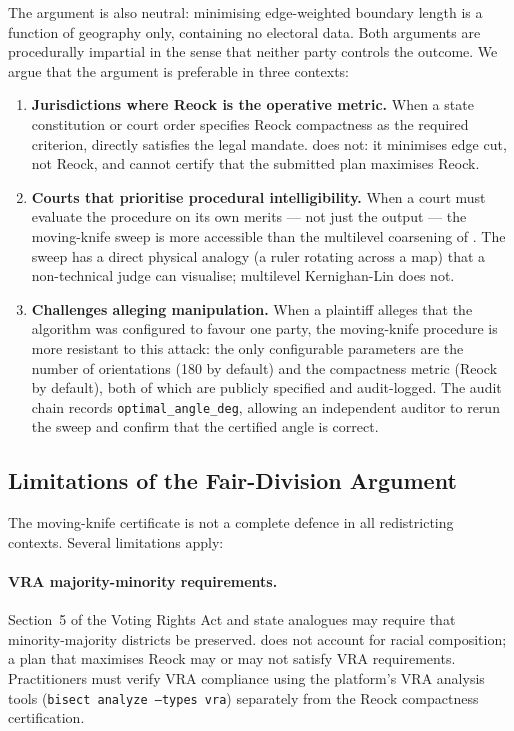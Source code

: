 The \metis{} argument is also neutral: minimising edge-weighted boundary
length is a function of geography only, containing no electoral data.
Both arguments are procedurally impartial in the sense that neither
party controls the outcome.
We argue that the \mka{} argument is preferable in three contexts:

\begin{enumerate}
\item \textbf{Jurisdictions where Reock is the operative metric.}
  When a state constitution or court order specifies Reock compactness
  as the required criterion, \mka{} directly satisfies the legal mandate.
  \metis{} does not: it minimises edge cut, not Reock, and cannot certify
  that the submitted plan maximises Reock.

\item \textbf{Courts that prioritise procedural intelligibility.}
  When a court must evaluate the procedure on its own merits --- not just
  the output --- the moving-knife sweep is more accessible than the
  multilevel coarsening of \metis{}.
  The sweep has a direct physical analogy (a ruler rotating across a map)
  that a non-technical judge can visualise; multilevel Kernighan-Lin does not.

\item \textbf{Challenges alleging manipulation.}
  When a plaintiff alleges that the algorithm was configured to favour one
  party, the moving-knife procedure is more resistant to this attack: the
  only configurable parameters are the number of orientations (180 by default)
  and the compactness metric (Reock by default), both of which are publicly
  specified and audit-logged.
  The audit chain records \texttt{optimal\_angle\_deg}, allowing an
  independent auditor to rerun the sweep and confirm that the certified
  angle is correct.
\end{enumerate}

\subsection{Limitations of the Fair-Division Argument}

The moving-knife certificate is not a complete defence in all redistricting
contexts.
Several limitations apply:

\paragraph{VRA majority-minority requirements.}
Section~5 of the Voting Rights Act and state analogues may require that
minority-majority districts be preserved.
\mka{} does not account for racial composition; a plan that maximises Reock
may or may not satisfy VRA requirements.
Practitioners must verify VRA compliance using the platform's VRA analysis
tools (\texttt{bisect analyze --types vra}) separately from the Reock
compactness certification.

